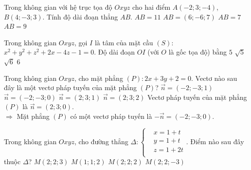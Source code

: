 \begin{ex}%
Trong không gian với hệ trục tọa độ $Oxyz$ cho hai điểm $A(-2; 3;-4)$, $B(4;-3; 3)$. Tính độ dài đoạn thẳng $AB$.
\choice
{\True $AB=11$}
{$AB=(6;-6; 7)$}
{$AB=7$}
{$AB=9$}
\end{ex}

\begin{ex}%
Trong không gian $Oxyz$, gọi $I$ là tâm của mặt cầu $(S)$: $x^2+y^2+z^2+2x-4z-1=0$. Độ dài đoạn $OI$ (với $O$ là gốc tọa độ) bằng
\choice
{$5$}
{\True $\sqrt{5}$}
{$\sqrt{6}$}
{$6$}
\end{ex}

\begin{ex}%
Trong không gian $Oxyz$, cho mặt phẳng $(P)\colon 2x+3y+2=0$. Vectơ nào sau đây là một vectơ pháp tuyến của mặt phẳng $(P)$?
\choice
{$\overrightarrow{n}=(-2;-3;1)$}
{\True $\overrightarrow{n}=(-2;-3;0)$}
{$\overrightarrow{n}=(2;3;1)$}
{$\overrightarrow{n}=(2;3;2)$}
\loigiai
{
Vectơ pháp tuyến của mặt phẳng $(P)$ là $\overrightarrow{n}=(2;3;0)$.\\
$\Rightarrow$ Mặt phẳng $(P)$ có một vectơ pháp tuyến là $-\overrightarrow{n}=(-2;-3;0)$.
}
\end{ex}

\begin{ex}%
Trong không gian $Oxyz$, cho đường thẳng $\Delta \colon \left\{ \begin{aligned}
& x=1+t \\ & y=1+t \\ & z=1+2t \\ \end{aligned} \right.$. Điểm nào sau đây thuộc $\Delta$?
\choice
{\True $M(2;2;3)$}
{$M(1;1;2)$}
{$M(2;2;2)$}
{$M(2;2;-3)$}
\end{ex}

